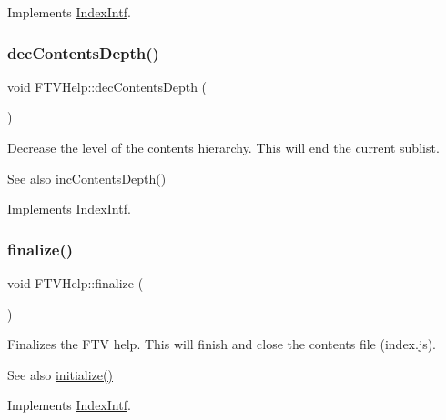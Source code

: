 Implements \mbox{\hyperlink{class_index_intf}{Index\+Intf}}.

\mbox{\label{class_f_t_v_help_a5949816300bc9d6a104dfd8305aa4e6f}} 
\subsubsection{\texorpdfstring{decContentsDepth()}{decContentsDepth()}}
{\footnotesize\ttfamily void F\+T\+V\+Help\+::dec\+Contents\+Depth (\begin{DoxyParamCaption}{ }\end{DoxyParamCaption})\hspace{0.3cm}{\ttfamily [virtual]}}

Decrease the level of the contents hierarchy. This will end the current sublist. \begin{DoxySeeAlso}{See also}
\mbox{\hyperlink{class_f_t_v_help_a86381415dd788cb4a1a0feac8d5316d8}{inc\+Contents\+Depth()}} 
\end{DoxySeeAlso}


Implements \mbox{\hyperlink{class_index_intf}{Index\+Intf}}.

\mbox{\label{class_f_t_v_help_a595c544e98100ca8aa84aaea4ac28e9f}} 
\subsubsection{\texorpdfstring{finalize()}{finalize()}}
{\footnotesize\ttfamily void F\+T\+V\+Help\+::finalize (\begin{DoxyParamCaption}{ }\end{DoxyParamCaption})\hspace{0.3cm}{\ttfamily [virtual]}}

Finalizes the F\+TV help. This will finish and close the contents file (index.\+js). \begin{DoxySeeAlso}{See also}
\mbox{\hyperlink{class_f_t_v_help_a791c63d8c0dc72e7fedc4f17163dbfa3}{initialize()}} 
\end{DoxySeeAlso}


Implements \mbox{\hyperlink{class_index_intf}{Index\+Intf}}.

\mbox{\label{class_f_t_v_help_a86381415dd788cb4a1a0feac8d5316d8}} 
